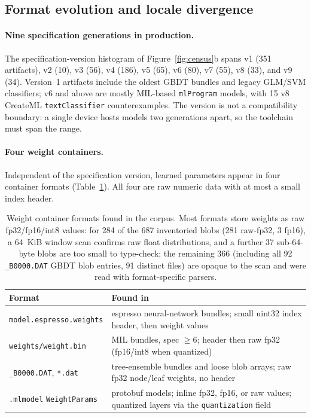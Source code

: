 \documentclass[letterpaper,twocolumn,10pt]{article}
\newcommand{\mlprogram}{\texttt{mlProgram}\xspace}
\begin{document}
\subsection{Format evolution and locale divergence}
\label{sec:formats}

\paragraph{Nine specification generations in production.}
The specification-version histogram of Figure~\ref{fig:census}b spans
v1 (351 artifacts), v2 (10), v3 (56), v4 (186), v5 (65), v6 (80), v7 (55),
v8 (33), and v9 (34). Version~1 artifacts include the oldest GBDT bundles
and legacy GLM/SVM classifiers; v6 and above are mostly MIL-based
\mlprogram{}
models, with 15 v8 CreateML \texttt{textClassifier} counterexamples.
The version is not a compatibility boundary: a single device hosts models
two generations apart, so the toolchain must span the range.

\paragraph{Four weight containers.}
Independent of the specification version, learned parameters appear in four
container formats (Table~\ref{tab:formats}).
All four are raw numeric data with at most a small index header.

\begin{table}[t]
\centering
\caption{Weight container formats found in the corpus.
Most formats store weights as raw fp32/fp16/int8 values: for 284 of the
687 inventoried blobs (281 raw-fp32, 3 fp16), a 64~KiB window scan
confirms raw float distributions, and a further 37 sub-64-byte blobs are
too small to type-check; the remaining 366 (including all 92
\texttt{\_B0000.DAT} GBDT blob entries, 91 distinct files) are opaque to
the scan and were read with format-specific parsers.}
\label{tab:formats}
\scriptsize
\setlength{\tabcolsep}{4pt}
\begin{tabular}{@{}>{\raggedright\arraybackslash}p{3.1cm}>{\raggedright\arraybackslash}p{3.4cm}@{}}
\toprule
\textbf{Format} & \textbf{Found in} \\
\midrule
\texttt{model.}\allowbreak\texttt{espresso.}\allowbreak\texttt{weights} & espresso neural-network bundles; small uint32 index header, then weight values \\
\texttt{weights/weight.bin} & MIL bundles, spec $\geq$6; header then raw fp32 (fp16/int8 when quantized) \\
\texttt{\_B0000.DAT}, \texttt{*.dat} & tree-ensemble bundles and loose blob arrays; raw fp32 node/leaf weights, no header \\
\texttt{.mlmodel} \texttt{WeightParams} & protobuf models; inline fp32, fp16, or raw values; quantized layers via the \texttt{quantization} field \\
\bottomrule
\end{tabular}
\end{table}
\end{document}
